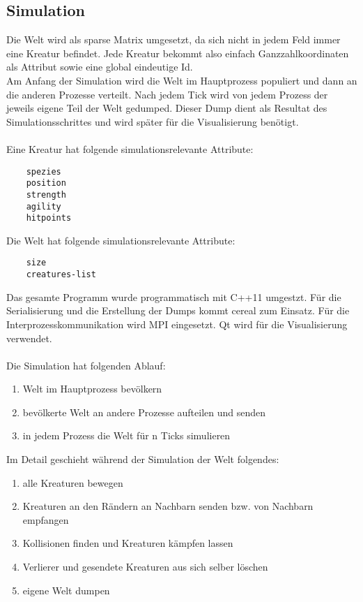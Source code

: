 \documentclass[a4paper,12pt]{article}
\begin{document}
\subsection{Simulation}
Die Welt wird als sparse Matrix umgesetzt, da sich nicht in jedem Feld immer
eine Kreatur befindet. Jede Kreatur bekommt also einfach Ganzzahlkoordinaten
als Attribut sowie eine global eindeutige Id.\\
Am Anfang der Simulation wird die Welt im Hauptprozess populiert und dann an
die anderen Prozesse verteilt.
Nach jedem Tick wird von jedem Prozess der jeweils eigene Teil der Welt gedumped.
Dieser Dump dient als Resultat des Simulationsschrittes und wird später für
die Visualisierung benötigt.
\\\\
Eine Kreatur hat folgende simulationsrelevante Attribute:
\begin{verbatim}
	spezies
	position
	strength
	agility
	hitpoints
\end{verbatim}

Die Welt hat folgende simulationsrelevante Attribute:
\begin{verbatim}
	size
	creatures-list
\end{verbatim}

Das gesamte Programm wurde programmatisch mit C++11 umgestzt. Für die
Serialisierung und die Erstellung der Dumps kommt cereal zum Einsatz.
Für die Interprozesskommunikation wird MPI eingesetzt. Qt wird für die
Visualisierung verwendet.
\\\\
Die Simulation hat folgenden Ablauf:
\begin{enumerate}
	\item Welt im Hauptprozess bevölkern
	\item bevölkerte Welt an andere Prozesse aufteilen und senden
	\item in jedem Prozess die Welt für n Ticks simulieren
\end{enumerate}
Im Detail geschieht während der Simulation der Welt folgendes:
\begin{enumerate}
	\item alle Kreaturen bewegen
	\item Kreaturen an den Rändern an Nachbarn senden bzw. von Nachbarn empfangen
	\item Kollisionen finden und Kreaturen kämpfen lassen
	\item Verlierer und gesendete Kreaturen aus sich selber löschen
	\item eigene Welt dumpen
\end{enumerate}
\end{document}
